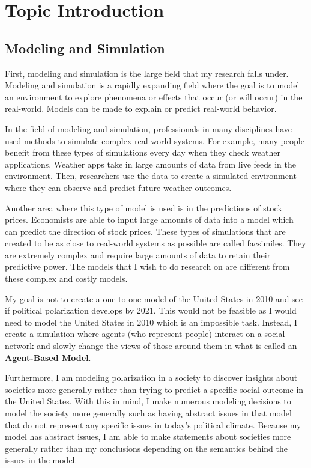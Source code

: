 \section{Topic Introduction}

\subsection{Modeling and Simulation}
First, modeling and simulation is the large field that my research falls under. Modeling and simulation is a rapidly expanding field where the goal is to model an environment to explore phenomena or effects that occur (or will occur) in the real-world. Models can be made to explain or predict real-world behavior. 

In the field of modeling and simulation, professionals in many disciplines have used methods to simulate complex real-world systems. For example, many people benefit from these types of simulations every day when they check weather applications. Weather apps take in large amounts of data from live feeds in the environment. Then, researchers use the data to create a simulated environment where they can observe and predict future weather outcomes. 


Another area where this type of model is used is in the predictions of stock prices. Economists are able to input large amounts of data into a model which can predict the direction of stock prices. These types of simulations that are created to be as close to real-world systems as possible are called facsimiles. They are extremely complex and require large amounts of data to retain their predictive power. The models that I wish to do research on are different from these complex and costly models. 

My goal is not to create a one-to-one model of the United States in 2010 and see if political polarization develops by 2021. This would not be feasible as I would need to model the United States in 2010 which is an impossible task. Instead, I create a simulation where agents (who represent people) interact on a social network and slowly change the views of those around them in what is called an \textbf{Agent-Based Model}. 

Furthermore, I am modeling polarization in a society to discover insights about societies more generally rather than trying to predict a specific social outcome in the United States. With this in mind, I make numerous modeling decisions to model the society more generally such as having abstract issues in that model that do not represent any specific issues in today's political climate. Because my model has abstract issues, I am able to make statements about societies more generally rather than my conclusions depending on the semantics behind the issues in the model.  

